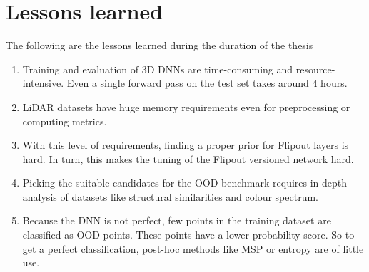     \section{Lessons learned}
    The following are the lessons learned during the duration of the thesis
    \begin{enumerate}
        \item Training and evaluation of 3D DNNs are time-consuming and resource-intensive. Even a single forward pass on the test set takes around 4 hours.
        \item LiDAR datasets have huge memory requirements even for preprocessing or computing metrics.
        \item With this level of requirements, finding a proper prior for Flipout layers is hard. In turn, this makes the tuning of the Flipout versioned network hard.
        \item Picking the suitable candidates for the OOD benchmark requires in depth analysis of datasets like structural similarities and colour spectrum.
        \item Because the DNN is not perfect, few points in the training dataset are classified as OOD points. These points have a lower probability score. So to get a perfect classification, post-hoc methods like MSP or entropy are of little use.
    \end{enumerate}

